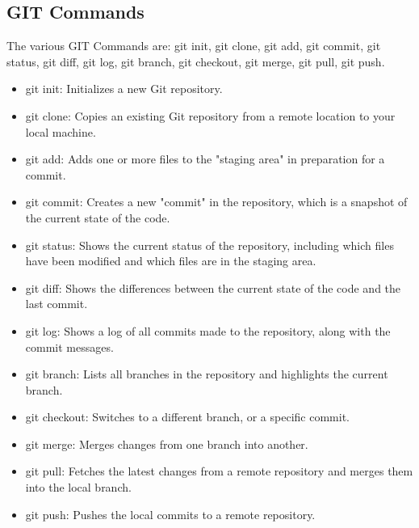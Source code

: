 \documentclass[conference]{IEEEtran}
\begin{document}
\subsection{GIT Commands}
The various GIT Commands are: 
git init, git clone, git add, git commit, git status, git diff, git log, git branch, git checkout, git merge, git pull, git push.
\begin{itemize}
\item git init: Initializes a new Git repository.
\item git clone: Copies an existing Git repository from a remote location to your local machine.  
\item git add: Adds one or more files to the "staging area" in preparation for a commit. 
\item git commit: Creates a new "commit" in the repository, which is a snapshot of the current state of the code. 
\item git status: Shows the current status of the repository, including which files have been modified and which files are in the staging area.
\item git diff: Shows the differences between the current state of the code and the last commit.
\item git log: Shows a log of all commits made to the repository, along with the commit messages.
\item git branch: Lists all branches in the repository and highlights the current branch.
\item git checkout: Switches to a different branch, or a specific commit.
\item git merge: Merges changes from one branch into another.
\item git pull: Fetches the latest changes from a remote repository and merges them into the local branch. 
\item git push: Pushes the local commits to a remote repository.
\end{itemize}
\end{document}
